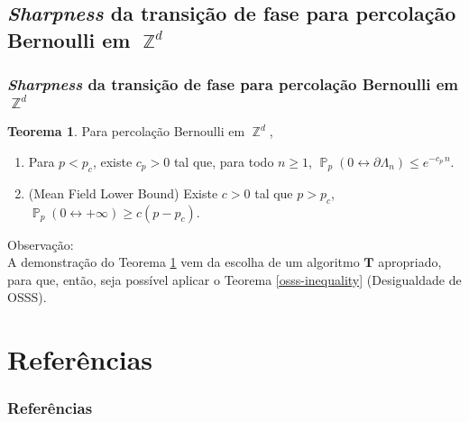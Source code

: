 \documentclass[12pt]{beamer}
\theoremstyle{definition} %
\newtheorem{mythm}{Teorema}
\DeclareMathOperator{\PX}{\mathbb{P}} %
\DeclareMathOperator{\ZX}{\mathbb{Z}} %
\begin{document}
	\subsection{\textit{Sharpness} da transição de fase para percolação Bernoulli em $\ZX^d$}
	\begin{frame}[t]
		\frametitle{\textit{Sharpness} da transição de fase para percolação Bernoulli em $\ZX^d$}
		\begin{mythm}
			Para percolação Bernoulli em $\ZX^d$,
			\begin{enumerate}
				\item Para $p < p_c$, existe $c_p > 0$ tal que, para todo $n \geq 1$, $\PX_p(0 \leftrightarrow \partial\Lambda_n) \leq e^{-c_p \, n}$.
				\item (Mean Field Lower Bound) Existe $c > 0$ tal que $p > p_c$, $\PX_p(0 \leftrightarrow +\infty) \geq c(p - p_c)$.
			\end{enumerate}
		\label{thm-decai-exp}
		\end{mythm}
		\pause
		\vspace{-8pt}
		Observação: \\
		A demonstração do Teorema \ref{thm-decai-exp} vem da escolha de um algoritmo $\boldsymbol{T}$ apropriado, para que, então, seja possível aplicar o Teorema \ref{osss-inequality} (Desigualdade de OSSS).
	\end{frame}

	\section{Referências}
	\begin{frame}[t]
		\frametitle{Referências}\vspace{5pt}
		\nocite{duminil2019sharp}
		
		
	\end{frame}
\end{document}
